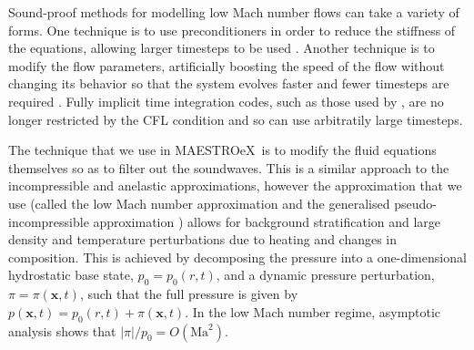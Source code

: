 \documentclass[a4paper]{jpconf}
\newcommand{\maestroex}{{\sffamily MAESTROeX}}
\begin{document}
Sound-proof methods for modelling low Mach number flows can take a variety of forms. One technique is to use preconditioners in order to reduce the stiffness of the equations, allowing larger timesteps to be used \cite{Miczek2014,Barsukow2016}. Another technique is to modify the flow parameters, artificially boosting the speed of the flow without changing its behavior so that the system evolves faster and fewer timesteps are required \citep{Rempel2005,Hotta2012}. Fully implicit time integration codes, such as those used by \cite{Viallet2011,Viallet2015,Goffrey2016}, are no longer restricted by the CFL condition and so can use arbitratily large timesteps.

The technique that we use in \maestroex~is to modify the fluid equations themselves so as to filter out the soundwaves. This is a similar approach to the incompressible \cite{Boussinesq1901} and anelastic \cite{Ogura1962a,Gough1968,Durran1989} approximations, however the approximation that we use (called the low Mach number approximation \cite{Day2000,Almgren2006a,Nonaka2010} and the generalised pseudo-incompressible approximation \cite{Vasil2013}) allows for background stratification and large density and temperature perturbations due to heating and changes in composition. This is achieved by decomposing the pressure into a one-dimensional hydrostatic base state, $p_0 = p_0(r, t)$, and a dynamic pressure perturbation, $\pi = \pi(\bm{x}, t)$, such that the full pressure is given by $p(\bm{x}, t) = p_0(r, t) + \pi(\bm{x}, t)$. In the low Mach number regime, asymptotic analysis shows that $|\pi|/p_0 = O(\mathrm{Ma}^2)$. 
\end{document}
